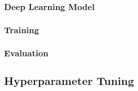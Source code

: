 \subsubsection{Deep Learning Model}


\subsubsection{Training}


\subsubsection{Evaluation}


\subsection{Hyperparameter Tuning}